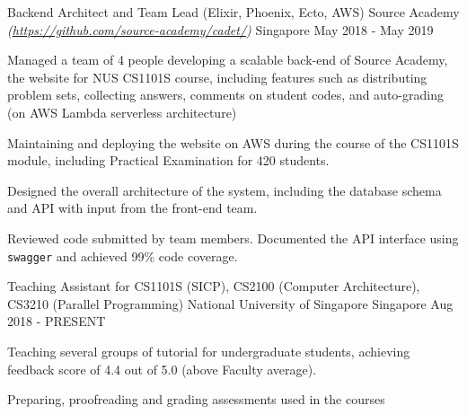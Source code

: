 \begin{cventries}
  \cventry
  {Backend Architect and Team Lead (Elixir, Phoenix, Ecto, AWS)} %
  {Source Academy \textmd{\em\tiny(\url{https://github.com/source-academy/cadet/})}} %
  {Singapore} %
  {May 2018 - May 2019} %
  {
    \begin{cvitems}
      \item {Managed a team of 4 people developing a scalable back-end of Source Academy, the website for NUS CS1101S course, including features such as distributing problem sets, collecting answers, comments on student codes, and auto-grading (on AWS Lambda serverless architecture)}
      \item {Maintaining and deploying the website on AWS during the course of the CS1101S module, including Practical Examination for 420 students.}
      \item {Designed the overall architecture of the system, including the database schema and API with input from the front-end team.}
      \item {Reviewed code submitted by team members. Documented the API interface using \texttt{swagger} and achieved 99\% code coverage.}
    \end{cvitems}
  }
  \cventry
  {Teaching Assistant for CS1101S (SICP), CS2100 (Computer Architecture), CS3210 (Parallel Programming)} %
  {National University of Singapore} %
  {Singapore} %
  {Aug 2018 - PRESENT} %
  {
    \begin{cvitems}
      \item {Teaching several groups of tutorial for undergraduate students, achieving feedback score of 4.4 out of 5.0 (above Faculty average).}
      \item {Preparing, proofreading and grading assessments used in the courses}
    \end{cvitems}
  }

\end{cventries}
